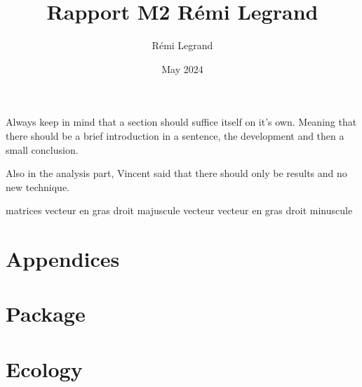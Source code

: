 \documentclass{article}
\title{Rapport M2 Rémi Legrand}
\author{Rémi Legrand}
\date{May 2024}
\begin{document}








\maketitle

Always keep in mind that a section should suffice itself on it's own. Meaning that there should be a brief introduction in a sentence, the development and then a small conclusion.

Also in the analysis part, Vincent said that there should only be results and no new technique.

matrices vecteur en gras droit majuscule
vecteur vecteur en gras droit minuscule




\section{Appendices}



\section{Package}



\section{Ecology}
\end{document}
